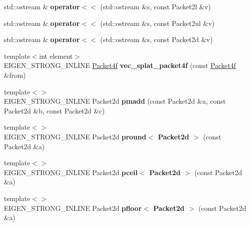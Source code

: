 \begin{DoxyCompactItemize}
std\+::ostream \& {\bfseries operator$<$$<$} (std\+::ostream \&s, const Packet2l \&v)
\item 
\mbox{\label{namespace_eigen_1_1internal_a178737855650fcff99a49c1714f01a6c}} 
std\+::ostream \& {\bfseries operator$<$$<$} (std\+::ostream \&s, const Packet2ul \&v)
\item 
\mbox{\label{namespace_eigen_1_1internal_a14fb8177a287ea9623b5522195795022}} 
std\+::ostream \& {\bfseries operator$<$$<$} (std\+::ostream \&s, const Packet2d \&v)
\item 
\mbox{\label{namespace_eigen_1_1internal_a086cd55d3b92f1ad1b99cd3dc50bb7ec}} 
{\footnotesize template$<$int element$>$ }\\E\+I\+G\+E\+N\+\_\+\+S\+T\+R\+O\+N\+G\+\_\+\+I\+N\+L\+I\+NE \hyperlink{struct_eigen_1_1internal_1_1_packet4f}{Packet4f} {\bfseries vec\+\_\+splat\+\_\+packet4f} (const \hyperlink{struct_eigen_1_1internal_1_1_packet4f}{Packet4f} \&from)
\item 
\mbox{\label{namespace_eigen_1_1internal_abdf0ea7e126fdf116b7e4d9200f7a90f}} 
{\footnotesize template$<$$>$ }\\E\+I\+G\+E\+N\+\_\+\+S\+T\+R\+O\+N\+G\+\_\+\+I\+N\+L\+I\+NE Packet2d {\bfseries pmadd} (const Packet2d \&a, const Packet2d \&b, const Packet2d \&c)
\item 
\mbox{\label{namespace_eigen_1_1internal_af045e33dd14e6fae168ee6094e461d9d}} 
{\footnotesize template$<$$>$ }\\E\+I\+G\+E\+N\+\_\+\+S\+T\+R\+O\+N\+G\+\_\+\+I\+N\+L\+I\+NE Packet2d {\bfseries pround$<$ Packet2d $>$} (const Packet2d \&a)
\item 
\mbox{\label{namespace_eigen_1_1internal_ac6302e439a7df6b9bee65c75aa2be26d}} 
{\footnotesize template$<$$>$ }\\E\+I\+G\+E\+N\+\_\+\+S\+T\+R\+O\+N\+G\+\_\+\+I\+N\+L\+I\+NE Packet2d {\bfseries pceil$<$ Packet2d $>$} (const Packet2d \&a)
\item 
\mbox{\label{namespace_eigen_1_1internal_afcef5b81d59c0cde536eac077cc8e581}} 
{\footnotesize template$<$$>$ }\\E\+I\+G\+E\+N\+\_\+\+S\+T\+R\+O\+N\+G\+\_\+\+I\+N\+L\+I\+NE Packet2d {\bfseries pfloor$<$ Packet2d $>$} (const Packet2d \&a)

\end{DoxyCompactItemize}
